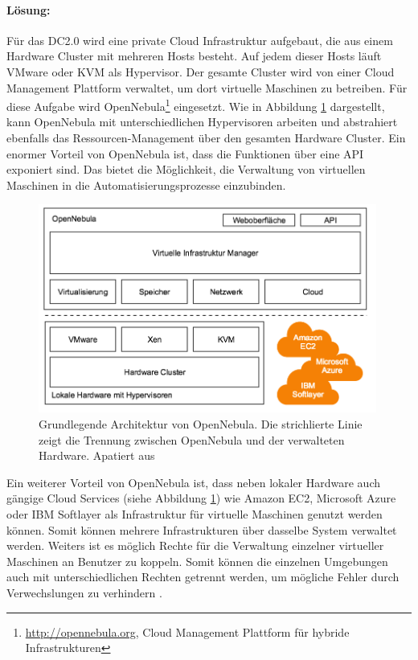 \paragraph{Lösung:} Für das DC2.0 wird eine private Cloud Infrastruktur aufgebaut, die aus einem Hardware Cluster mit mehreren Hosts besteht. Auf jedem dieser Hosts läuft VMware oder KVM als Hypervisor. Der gesamte Cluster wird von einer Cloud Management Plattform verwaltet, um dort virtuelle Maschinen zu betreiben. Für diese Aufgabe wird OpenNebula\footnote{\url{http://opennebula.org}, Cloud Management Plattform für hybride Infrastrukturen} eingesetzt. Wie in Abbildung \ref{fig:opennebula_architecture} dargestellt, kann OpenNebula mit unterschiedlichen Hypervisoren arbeiten und abstrahiert ebenfalls das Ressourcen-Management über den gesamten Hardware Cluster. Ein enormer Vorteil von OpenNebula ist, dass die Funktionen über eine API exponiert sind. Das bietet die Möglichkeit, die Verwaltung von virtuellen Maschinen in die Automatisierungsprozesse einzubinden.
\begin{figure}[ht]
	\centering
	\includegraphics[width=0.99\textwidth]{img/opennebula.png}
	\caption[Architektur von OpenNebula, apatiert aus \cite{molina2012}]{Grundlegende Architektur von OpenNebula. Die strichlierte Linie zeigt die Trennung zwischen OpenNebula und der verwalteten Hardware. Apatiert aus \cite{molina2012}}
	\label{fig:opennebula_architecture}
\end{figure} 

Ein weiterer Vorteil von OpenNebula ist, dass neben lokaler Hardware auch gängige Cloud Services (siehe Abbildung \ref{fig:opennebula_architecture}) wie Amazon EC2, Microsoft Azure oder IBM Softlayer als Infrastruktur für virtuelle Maschinen genutzt werden können. Somit können mehrere Infrastrukturen über dasselbe System verwaltet werden. Weiters ist es möglich Rechte für die Verwaltung einzelner virtueller Maschinen an Benutzer zu koppeln. Somit können die einzelnen Umgebungen auch mit unterschiedlichen Rechten getrennt werden, um mögliche Fehler durch Verwechslungen zu verhindern \cite{molina2012}.

